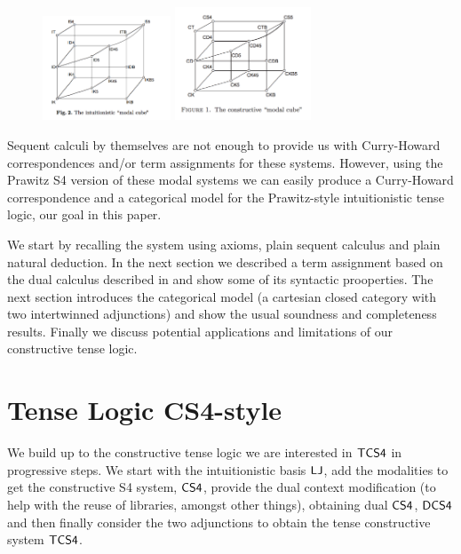 \documentclass{article}
\begin{document}
\begin{figure}[h!]
\centering
\includegraphics[width=1.5in]{intmodalcube.pdf}
\includegraphics[width=1.6in]{constructivemodalcube.pdf}
\label{fig:modalcube}
\end{figure}

Sequent calculi  by themselves are not enough to provide us with Curry-Howard correspondences and/or term assignments for these systems. However, using the Prawitz S4 version of these modal systems we can easily produce a Curry-Howard correspondence and a categorical model for the Prawitz-style intuitionistic tense logic, our goal in this paper. 

We start by recalling the system using axioms, plain sequent calculus and plain natural deduction. In the next section we described a term assignment based on the dual calculus described in \cite{icalp1998} and show some of its syntactic prooperties. The next section  introduces the categorical model (a cartesian closed category with two intertwinned adjunctions) and show the usual soundness and completeness results. Finally we discuss potential applications and  limitations of our constructive tense logic.

\section{Tense Logic CS4-style}
We build up to the constructive tense logic we are interested in $\sf{TCS4}$ in progressive steps. We start with the intuitionistic basis $\sf{LJ}$, add the modalities to get the constructive S4 system, $\sf{CS4}$, provide the dual context modification (to help with the reuse of libraries, amongst other things), obtaining dual $\sf{CS4}$, $\sf{DCS4}$ and then finally consider the two adjunctions to obtain the tense constructive system $\sf{TCS4}$.
\end{document}

